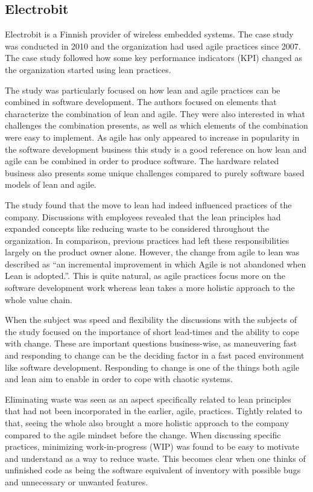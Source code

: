 \subsection{Electrobit}
\label{finnishprovider}

Electrobit is a Finnish provider of wireless embedded systems. The case study was conducted in 2010 and the organization had used agile practices since 2007. The case study followed how some key performance indicators (KPI) changed as the organization started using lean practices. \cite{Rodriguez2014Combining}

The study was particularly focused on how lean and agile practices can be combined in software development. The authors focused on elements that characterize the combination of lean and agile. They were also interested in what challenges the combination presents, as well as which elements of the combination were easy to implement.\cite{Rodriguez2014Combining} As agile has only appeared to increase in popularity in the software development business this study is a good reference on how lean and agile can be combined in order to produce software. The hardware related business also presents some unique challenges compared to purely software based models of lean and agile.

The study found that the move to lean had indeed influenced practices of the company. Discussions with employees revealed that the lean principles had expanded concepts like reducing waste to be considered throughout the organization. In comparison, previous practices had left these responsibilities largely on the product owner alone. However, the change from agile to lean was described as ``an incremental improvement in which Agile is not abandoned when Lean is adopted.''\cite{Rodriguez2014Combining}. This is quite natural, as agile practices focus more on the software development work whereas lean takes a more holistic approach to the whole value chain.

When the subject was speed and flexibility the discussions with the subjects of the study focused on the importance of short lead-times and the ability to cope with change.\cite{Rodriguez2014Combining} These are important questions business-wise, as maneuvering fast and responding to change can be the deciding factor in a fast paced environment like software development. Responding to change is one of the things both agile and lean aim to enable in order to cope with chaotic systems.

Eliminating waste was seen as an aspect specifically related to lean principles that had not been incorporated in the earlier, agile, practices. Tightly related to that, seeing the whole also brought a more holistic approach to the company compared to the agile mindset before the change. When discussing specific practices, minimizing work-in-progress (WIP) was found to be easy to motivate and understand as a way to reduce waste.\cite{Rodriguez2014Combining} This becomes clear when one thinks of unfinished code as being the software equivalent of inventory with possible bugs and unnecessary or unwanted features.

